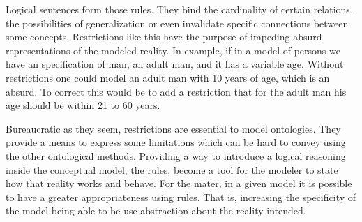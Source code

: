 Logical sentences form those rules. They bind the cardinality of certain relations, the possibilities of generalization or even invalidate specific connections between some concepts. Restrictions like this have the purpose of impeding absurd representations of the modeled reality. In example, if in a model of persons we have an specification of man, an adult man, and it has a variable age. Without restrictions one could model an adult man with 10 years of age, which is an absurd. To correct this would be to add a restriction that for the adult man his age should be within 21 to 60 years.

Bureaucratic as they seem, restrictions are essential to model ontologies. They provide a means to express some limitations which can be hard to convey using the other ontological methods. Providing a way to introduce a logical reasoning inside the conceptual model, the rules, become a tool for the modeler to state how that reality works and behave. For the mater, in a given model it is possible to have a greater appropriateness using rules. That is, increasing the specificity of the model being able to be use abstraction about the reality intended.